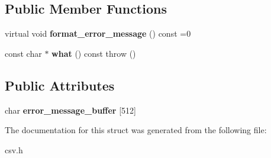 \subsection*{Public Member Functions}
\begin{DoxyCompactItemize}
\item 
virtual void {\bfseries format\+\_\+error\+\_\+message} () const =0\label{structio_1_1error_1_1base_a7d9ff6a31b716a24f056cf8a3e15191d}

\item 
const char $\ast$ {\bfseries what} () const   throw ()\label{structio_1_1error_1_1base_ad99d4a2459e51ce2c24707569c4a0df6}

\end{DoxyCompactItemize}
\subsection*{Public Attributes}
\begin{DoxyCompactItemize}
\item 
char {\bfseries error\+\_\+message\+\_\+buffer} [512]\label{structio_1_1error_1_1base_a3be516c4636b7b61133968cb8081c885}

\end{DoxyCompactItemize}


The documentation for this struct was generated from the following file\+:\begin{DoxyCompactItemize}
\item 
csv.\+h\end{DoxyCompactItemize}

